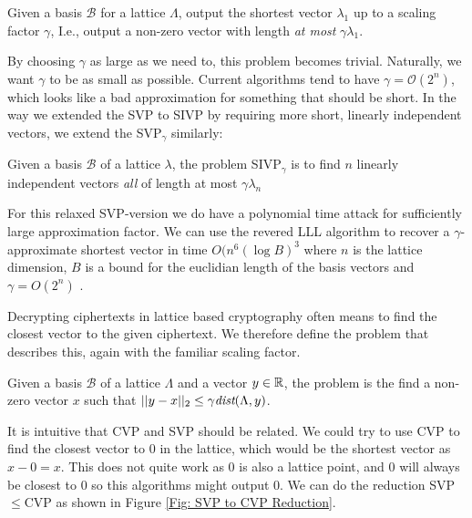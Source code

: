     \begin{definition}
        Given a basis \(\mathcal{B}\) for a lattice \(\Lambda\), output the shortest vector \(\lambda_1\) up to a scaling factor \(\gamma\), I.e., output a non-zero vector with length \emph{at most} \(\gamma\lambda_1\).
    \end{definition}
    By choosing \(\gamma\) as large as we need to, this problem becomes trivial. Naturally, we want \(\gamma\) to be as small as possible. Current algorithms tend to have \(\gamma=\mathcal{O}(2^n)\), which looks like a bad approximation for something that should be short. In the way we extended the SVP to SIVP by requiring more short, linearly independent vectors, we extend the SVP\(_\gamma\) similarly:
    \begin{definition}
        Given a basis \(\mathcal{B}\) of a lattice \(\lambda\), the problem SIVP\(_\gamma\) is to find \(n\) linearly independent vectors \emph{all } of length at most \(\gamma\lambda_n\)
    \end{definition}
    For this relaxed SVP-version we do have a polynomial time attack for sufficiently large approximation factor. We can use the revered LLL algorithm to recover a \(\gamma\)-approximate shortest vector in time \(O(n^6(\log B)^3\) where \(n\) is the lattice dimension, \(B\) is a bound for the euclidian length of the basis vectors and \(\gamma = O(2^n)\) \cite{Galteland}.\par
    
    Decrypting  ciphertexts in lattice based cryptography often means to find the closest vector to the given ciphertext. We therefore define the problem that describes this, again with the familiar scaling factor.
    \begin{definition}
    Given a basis \(\mathcal{B}\) of a lattice \(\Lambda\) and a vector \(y\in\mathbb{R}\), the problem is the find a non-zero vector \(x\) such that \(||y-x||_2\leq\gamma \emph{dist}(\Lambda , y)\).
    \end{definition}
    It is intuitive that CVP and SVP should be related. We could try to use CVP to find the closest vector to 0 in the lattice, which would be the shortest vector as \(x - 0 = x\). This does not quite work as 0 is also a lattice point, and 0 will always be closest to 0 so this algorithms might output 0. We can do the reduction SVP\(\leq\)CVP as shown in Figure \ref{Fig: SVP to CVP Reduction}. 
    
